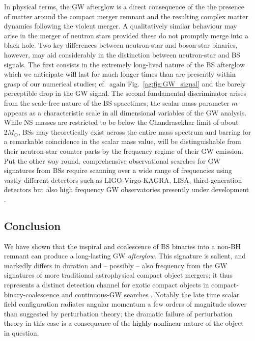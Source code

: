 In physical terms, the GW afterglow is a direct consequence
of the the presence of matter around the compact merger remnant
and the resulting complex matter dynamics following the violent
merger. A qualitatively similar behaviour may arise in the
merger of neutron stars provided these do not promptly merge
into a black hole. Two key differences between neutron-star
and boson-star binaries, however, may aid considerably in the
distinction between neutron-star and BS
signals. The first consists in the
extremely long-lived nature of the BS afterglow which we
anticipate will last for much longer times than are presently
within grasp of our numerical studies; cf.~again Fig.~\ref{ag:fig:GW_signal} and the barely perceptible
drop in the GW signal. The second fundamental discriminator
arises from the scale-free nature of the BS spacetimes;
the scalar mass parameter $m$ appears as a characteristic
scale in all dimensional variables of the GW analysis.
While NS masses are restricted to be below the Chandrasekhar limit of about $2 M_{\odot}$, BSs may theoretically exist
across the entire mass spectrum and barring for a remarkable
coincidence in the scalar mass value, will be distinguishable
from their neutron-star counter parts by the frequency regime
of their GW emission. Put the other way round, comprehensive
observational searches for GW signatures from BSs require
scanning over a wide range of frequencies using vastly
different detectors such as LIGO-Virgo-KAGRA, LISA,
third-generation detectors but also high frequency GW observatories presently under development \cite{Aggarwal:2020olq,Badurina:2019hst}.



\subsection{Conclusion}\label{ag:sec:conclusion}


We have shown that the inspiral and
coalescence of BS binaries into a non-BH remnant can produce a long-lasting GW {\it afterglow}.
This signature is salient, and markedly differs in duration and -- possibly -- also
frequency from the GW signatures of more traditional astrophysical compact object mergers;
it thus represents a distinct detection channel for exotic compact objects
in compact-binary-coalescence and continuous-GW searches
\cite{LIGOScientific:2019yhl,KAGRA:2021una,LIGOScientific:2021jlr,LIGOScientific:2021oez,LIGOScientific:2022lsr,LIGOScientific:2022pjk,LIGOScientific:2021hvc,LIGOScientific:2021ozr}.
Notably the late time scalar field configuration radiates angular
momentum a few orders of magnitude slower than suggested by perturbation theory;
the dramatic failure of perturbation theory in this case is a consequence of
the highly nonlinear nature of the object in question.

